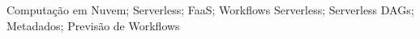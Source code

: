\acresetall
\noindent Computação em Nuvem; Serverless; FaaS; Workflows Serverless; Serverless DAGs; Metadados; Previsão de Workflows